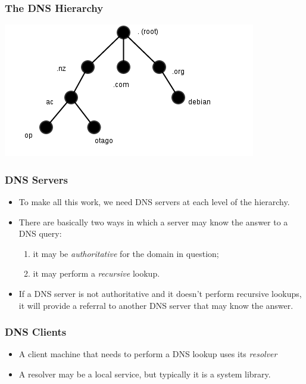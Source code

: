 \documentclass[10pt]{beamer}
\begin{document}
\begin{frame}
  \frametitle{The DNS Hierarchy}

 \includegraphics[scale=0.6]{dns.png}

\end{frame}



\begin{frame}
  \frametitle{DNS Servers}

 \begin{itemize}
  \item To make all this work, we need DNS servers at each level of the 
        hierarchy.
  \item There are basically two ways in which a server may know the answer
        to a DNS query:
        \begin{enumerate}
          \item it may be \emph{authoritative} for the domain in question;
          \item it may perform a \emph{recursive} lookup.
        \end{enumerate}
  \item If a DNS server is not authoritative and it doesn't perform recursive
        lookups, it will provide a referral to another DNS server that may
        know the answer.
 \end{itemize}

\end{frame}

\begin{frame}
  \frametitle{DNS Clients}

 
 \begin{itemize}
  \item A client machine that needs to perform a DNS lookup uses its
        \emph{resolver}
  \item A resolver may be a local service, but typically it is a system 
        library.
 \end{itemize}

\end{frame}
\end{document}
